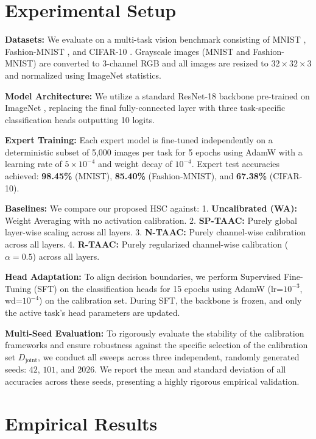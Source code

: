 \documentclass{article}
\begin{document}
\section{Experimental Setup}
\label{sec:setup}
\textbf{Datasets:} We evaluate on a multi-task vision benchmark consisting of MNIST \cite{lecun1998gradient}, Fashion-MNIST \cite{xiao2017fashion}, and CIFAR-10 \cite{krizhevsky2009learning}. Grayscale images (MNIST and Fashion-MNIST) are converted to 3-channel RGB and all images are resized to $32 \times 32 \times 3$ and normalized using ImageNet statistics.

\textbf{Model Architecture:} We utilize a standard ResNet-18 backbone pre-trained on ImageNet \cite{he2016deep}, replacing the final fully-connected layer with three task-specific classification heads outputting 10 logits.

\textbf{Expert Training:} Each expert model is fine-tuned independently on a deterministic subset of 5,000 images per task for 5 epochs using AdamW with a learning rate of $5 \times 10^{-4}$ and weight decay of $10^{-4}$. Expert test accuracies achieved: \textbf{98.45\%} (MNIST), \textbf{85.40\%} (Fashion-MNIST), and \textbf{67.38\%} (CIFAR-10).

\textbf{Baselines:} We compare our proposed HSC against:
1. \textbf{Uncalibrated (WA):} Weight Averaging with no activation calibration.
2. \textbf{SP-TAAC:} Purely global layer-wise scaling across all layers.
3. \textbf{N-TAAC:} Purely channel-wise calibration across all layers.
4. \textbf{R-TAAC:} Purely regularized channel-wise calibration ($\alpha=0.5$) across all layers.

\textbf{Head Adaptation:} To align decision boundaries, we perform Supervised Fine-Tuning (SFT) on the classification heads for 15 epochs using AdamW (lr=$10^{-3}$, wd=$10^{-4}$) on the calibration set. During SFT, the backbone is frozen, and only the active task's head parameters are updated.

\textbf{Multi-Seed Evaluation:} To rigorously evaluate the stability of the calibration frameworks and ensure robustness against the specific selection of the calibration set $D_{\text{joint}}$, we conduct all sweeps across three independent, randomly generated seeds: $42$, $101$, and $2026$. We report the mean and standard deviation of all accuracies across these seeds, presenting a highly rigorous empirical validation.

\section{Empirical Results}
\label{sec:results}
\end{document}
